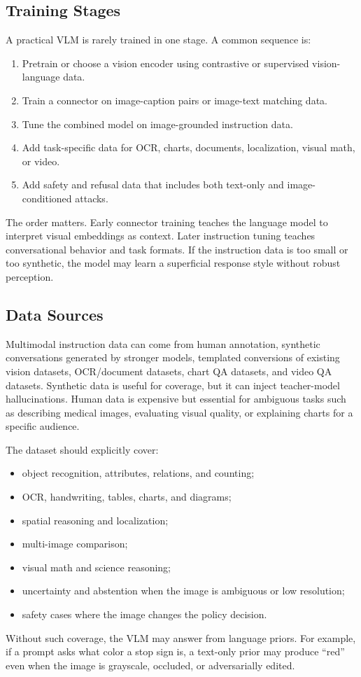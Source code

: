 \subsection{Training Stages}
A practical VLM is rarely trained in one stage. A common sequence is:
\begin{enumerate}
    \item Pretrain or choose a vision encoder using contrastive or supervised vision-language data.
    \item Train a connector on image-caption pairs or image-text matching data.
    \item Tune the combined model on image-grounded instruction data.
    \item Add task-specific data for OCR, charts, documents, localization, visual math, or video.
    \item Add safety and refusal data that includes both text-only and image-conditioned attacks.
\end{enumerate}
The order matters. Early connector training teaches the language model to interpret visual embeddings as context. Later instruction tuning teaches conversational behavior and task formats. If the instruction data is too small or too synthetic, the model may learn a superficial response style without robust perception.

\subsection{Data Sources}
Multimodal instruction data can come from human annotation, synthetic conversations generated by stronger models, templated conversions of existing vision datasets, OCR/document datasets, chart QA datasets, and video QA datasets. Synthetic data is useful for coverage, but it can inject teacher-model hallucinations. Human data is expensive but essential for ambiguous tasks such as describing medical images, evaluating visual quality, or explaining charts for a specific audience.

The dataset should explicitly cover:
\begin{itemize}
    \item object recognition, attributes, relations, and counting;
    \item OCR, handwriting, tables, charts, and diagrams;
    \item spatial reasoning and localization;
    \item multi-image comparison;
    \item visual math and science reasoning;
    \item uncertainty and abstention when the image is ambiguous or low resolution;
    \item safety cases where the image changes the policy decision.
\end{itemize}
Without such coverage, the VLM may answer from language priors. For example, if a prompt asks what color a stop sign is, a text-only prior may produce ``red'' even when the image is grayscale, occluded, or adversarially edited.

